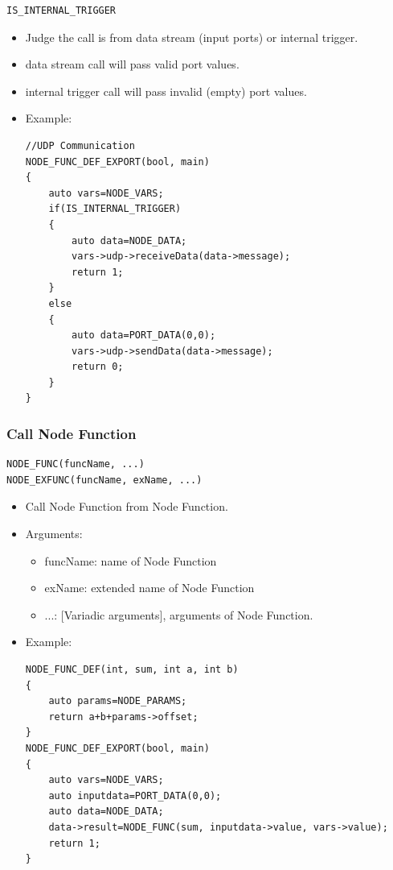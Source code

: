 \documentclass[a4paper,10pt]{book}
\begin{document}
\begin{mdframed}
\begin{verbatim}
IS_INTERNAL_TRIGGER
\end{verbatim}
\begin{itemize}
 \item Judge the call is from data stream (input ports) or internal trigger.
 \item data stream call will pass valid port values.
 \item internal trigger call will pass invalid (empty) port values.
 \item Example:
\begin{verbatim}
//UDP Communication
NODE_FUNC_DEF_EXPORT(bool, main)
{
    auto vars=NODE_VARS;
    if(IS_INTERNAL_TRIGGER)
    {
        auto data=NODE_DATA;
        vars->udp->receiveData(data->message);
        return 1;
    }
    else
    {
        auto data=PORT_DATA(0,0);
        vars->udp->sendData(data->message);
        return 0;
    }
}
\end{verbatim}
\end{itemize}
\end{mdframed}

\subsubsection{Call Node Function}

\begin{mdframed}
\begin{verbatim}
NODE_FUNC(funcName, ...)
NODE_EXFUNC(funcName, exName, ...)
\end{verbatim}
\begin{itemize}
 \item Call Node Function from Node Function.
 \item Arguments:
 \begin{itemize}
  \item funcName: name of Node Function
  \item exName: extended name of Node Function
  \item ...: [Variadic arguments], arguments of Node Function.
 \end{itemize}
 \item Example:
 \begin{verbatim}
NODE_FUNC_DEF(int, sum, int a, int b)
{
    auto params=NODE_PARAMS;
    return a+b+params->offset;
}
NODE_FUNC_DEF_EXPORT(bool, main)
{
    auto vars=NODE_VARS;
    auto inputdata=PORT_DATA(0,0);
    auto data=NODE_DATA;
    data->result=NODE_FUNC(sum, inputdata->value, vars->value);   
    return 1;
}
 \end{verbatim}
\end{itemize}
\end{mdframed}
\end{document}
